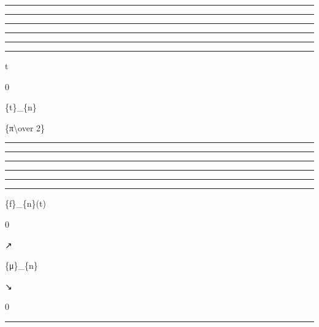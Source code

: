 \documentclass[]{article}
\begin{document}
\begin{center}\rule{3in}{0.4pt}\end{center}

\begin{center}\rule{3in}{0.4pt}\end{center}

\begin{center}\rule{3in}{0.4pt}\end{center}

\begin{center}\rule{3in}{0.4pt}\end{center}

\begin{center}\rule{3in}{0.4pt}\end{center}

\begin{center}\rule{3in}{0.4pt}\end{center}

t

0

\{t\}\_\{n\}

\{π\textbackslash{}over 2\}

\begin{center}\rule{3in}{0.4pt}\end{center}

\begin{center}\rule{3in}{0.4pt}\end{center}

\begin{center}\rule{3in}{0.4pt}\end{center}

\begin{center}\rule{3in}{0.4pt}\end{center}

\begin{center}\rule{3in}{0.4pt}\end{center}

\begin{center}\rule{3in}{0.4pt}\end{center}

\{f\}\_\{n\}(t)

0

↗

\{μ\}\_\{n\}

↘

0

\begin{center}\rule{3in}{0.4pt}\end{center}
\end{document}
